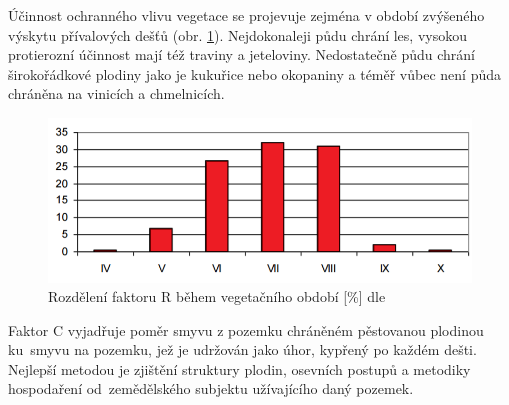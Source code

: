 Účinnost ochranného vlivu vegetace se projevuje zejména v období
zvýšeného výskytu přívalových dešťů
(obr. \ref{fig:r_faktor_graph}). Nejdokonaleji půdu chrání les,
vysokou protierozní účinnost mají též traviny a
jeteloviny. Nedostatečně půdu chrání širokořádkové plodiny jako je
kukuřice nebo okopaniny a téměř vůbec není půda chráněna na vinicích a
chmelnicích.
\vspace{-10pt}
\begin{figure}[H]
    \centering
    \includegraphics[scale=0.6]{./pictures/r_factor_graph.png}
      \caption[Rozdělení faktoru R během vegetačního období]{Rozdělení
        faktoru R během vegetačního období [\%] dle
        \cite{janecek2012}}
      \label{fig:r_faktor_graph}
\end{figure}
\vspace{-16pt} Faktor C vyjadřuje poměr smyvu z pozemku chráněném
pěstovanou plodinou ku~smyvu na pozemku, jež je udržován jako úhor,
kypřený po každém dešti. Nejlepší metodou je zjištění struktury
plodin, osevních postupů a metodiky hospodaření od~zemědělského
subjektu užívajícího daný pozemek.

